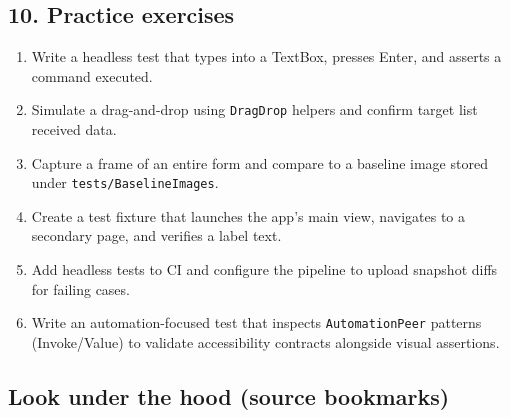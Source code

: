 \subsection{10. Practice exercises}\label{practice-exercises-15}

\begin{enumerate}
\def\labelenumi{\arabic{enumi}.}
\tightlist
\item
  Write a headless test that types into a TextBox, presses Enter, and
  asserts a command executed.
\item
  Simulate a drag-and-drop using \passthrough{\lstinline!DragDrop!}
  helpers and confirm target list received data.
\item
  Capture a frame of an entire form and compare to a baseline image
  stored under \passthrough{\lstinline!tests/BaselineImages!}.
\item
  Create a test fixture that launches the app's main view, navigates to
  a secondary page, and verifies a label text.
\item
  Add headless tests to CI and configure the pipeline to upload snapshot
  diffs for failing cases.
\item
  Write an automation-focused test that inspects
  \passthrough{\lstinline!AutomationPeer!} patterns (Invoke/Value) to
  validate accessibility contracts alongside visual assertions.
\end{enumerate}

\subsection{Look under the hood (source
bookmarks)}\label{look-under-the-hood-source-bookmarks-19}

